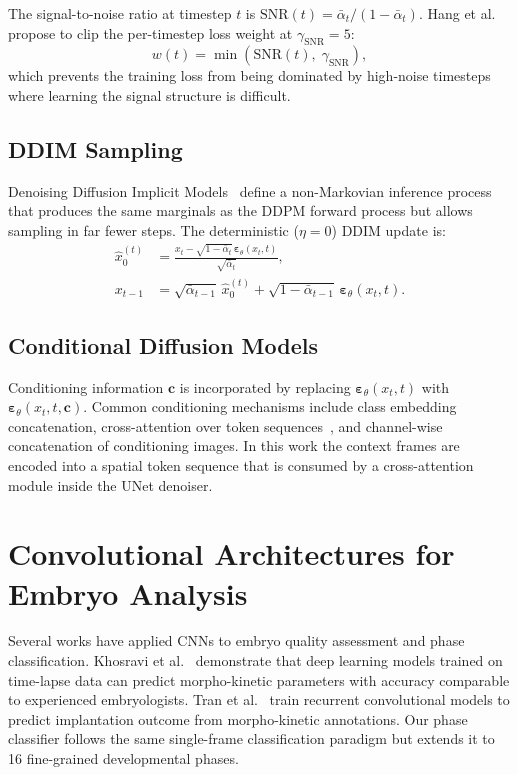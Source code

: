 \documentclass[12pt, a4paper, twoside]{report}
\newcommand{\eps}{\boldsymbol{\varepsilon}}
\begin{document}
The signal-to-noise ratio at timestep $t$ is
$\text{SNR}(t) = \bar\alpha_t / (1 - \bar\alpha_t)$.
Hang et al.~\cite{hang2023minsnr} propose to clip the per-timestep loss
weight at $\gamma_{\text{SNR}} = 5$:
\[
  w(t) = \min\!\left(\text{SNR}(t),\; \gamma_{\text{SNR}}\right),
\]
which prevents the training loss from being dominated by high-noise
timesteps where learning the signal structure is difficult.

\subsection{DDIM Sampling}
\label{ssec:ddim}

Denoising Diffusion Implicit Models~\cite{song2021ddim} define a
non-Markovian inference process that produces the same marginals as the DDPM
forward process but allows sampling in far fewer steps.
The deterministic ($\eta = 0$) DDIM update is:
\begin{align}
  \hat{x}_0^{(t)} &= \frac{x_t - \sqrt{1-\bar\alpha_t}\,\eps_\theta(x_t,t)}
                        {\sqrt{\bar\alpha_t}}, \\
  x_{t-1} &= \sqrt{\bar\alpha_{t-1}}\, \hat{x}_0^{(t)}
             + \sqrt{1-\bar\alpha_{t-1}}\, \eps_\theta(x_t, t).
\end{align}

\subsection{Conditional Diffusion Models}
\label{ssec:conditional}

Conditioning information $\mathbf{c}$ is incorporated by replacing
$\eps_\theta(x_t, t)$ with $\eps_\theta(x_t, t, \mathbf{c})$.
Common conditioning mechanisms include class embedding concatenation,
cross-attention over token sequences~\cite{rombach2022ldm,ramesh2022dalle2},
and channel-wise concatenation of conditioning images.
In this work the context frames are encoded into a spatial token sequence
that is consumed by a cross-attention module inside the UNet denoiser.

\section{Convolutional Architectures for Embryo Analysis}
\label{sec:related_cnn}

Several works have applied CNNs to embryo quality assessment and phase
classification.
Khosravi et al.~\cite{khosravi2019} demonstrate that deep learning models
trained on time-lapse data can predict morpho-kinetic parameters with
accuracy comparable to experienced embryologists.
Tran et al.~\cite{tran2019} train recurrent convolutional models to
predict implantation outcome from morpho-kinetic annotations.
Our phase classifier follows the same single-frame classification paradigm
but extends it to 16 fine-grained developmental phases.
\end{document}
